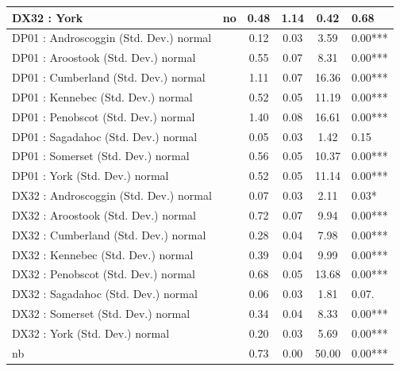 \begin{table}
\begin{center}
\begin{tabular}{|l|l|c|c|c|l|}
			\hline
			DX32 : York & no & 0.48 & 1.14 & 0.42 & 0.68 \\
			\hline
			DP01 : Androscoggin (Std. Dev.) normal &  & 0.12 & 0.03 & 3.59 & 0.00*** \\
			\hline
			DP01 : Aroostook (Std. Dev.) normal &  & 0.55 & 0.07 & 8.31 & 0.00*** \\
			\hline
			DP01 : Cumberland (Std. Dev.) normal &  & 1.11 & 0.07 & 16.36 & 0.00*** \\
			\hline
			DP01 : Kennebec (Std. Dev.) normal &  & 0.52 & 0.05 & 11.19 & 0.00*** \\
			\hline
			DP01 : Penobscot (Std. Dev.) normal &  & 1.40 & 0.08 & 16.61 & 0.00*** \\
			\hline
			DP01 : Sagadahoc (Std. Dev.) normal &  & 0.05 & 0.03 & 1.42 & 0.15 \\
			\hline
			DP01 : Somerset (Std. Dev.) normal &  & 0.56 & 0.05 & 10.37 & 0.00*** \\
			\hline
			DP01 : York (Std. Dev.) normal &  & 0.52 & 0.05 & 11.14 & 0.00*** \\
			\hline
			DX32 : Androscoggin (Std. Dev.) normal &  & 0.07 & 0.03 & 2.11 & 0.03* \\
			\hline
			DX32 : Aroostook (Std. Dev.) normal &  & 0.72 & 0.07 & 9.94 & 0.00*** \\
			\hline
			DX32 : Cumberland (Std. Dev.) normal &  & 0.28 & 0.04 & 7.98 & 0.00*** \\
			\hline
			DX32 : Kennebec (Std. Dev.) normal &  & 0.39 & 0.04 & 9.99 & 0.00*** \\
			\hline
			DX32 : Penobscot (Std. Dev.) normal &  & 0.68 & 0.05 & 13.68 & 0.00*** \\
			\hline
			DX32 : Sagadahoc (Std. Dev.) normal &  & 0.06 & 0.03 & 1.81 & 0.07. \\
			\hline
			DX32 : Somerset (Std. Dev.) normal &  & 0.34 & 0.04 & 8.33 & 0.00*** \\
			\hline
			DX32 : York (Std. Dev.) normal &  & 0.20 & 0.03 & 5.69 & 0.00*** \\
			\hline
			nb &  & 0.73 & 0.00 & 50.00 & 0.00*** \\
			\hline
		\end{tabular}
	\end{center}
\end{table}